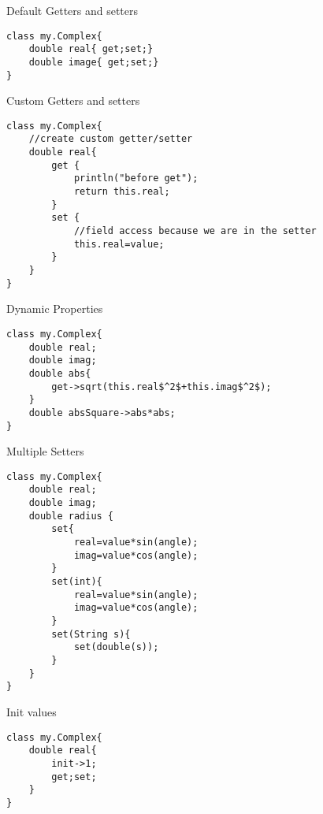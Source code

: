 \documentclass{tufte-book}
\begin{document}
            
            Default Getters and setters
\lstset{mathescape=true}
            \begin{lstlisting}
class my.Complex{
    double real{ get;set;}
    double image{ get;set;}
}
            \end{lstlisting}
\lstset{mathescape=false}

            
            Custom Getters and setters
\lstset{mathescape=true}
            \begin{lstlisting}
class my.Complex{
    //create custom getter/setter
    double real{
        get {
            println("before get");
            return this.real;
        }
        set {
            //field access because we are in the setter
            this.real=value;
        }
    }
}
            \end{lstlisting}
\lstset{mathescape=false}


            Dynamic Properties
\lstset{mathescape=true}
            \begin{lstlisting}
class my.Complex{
    double real;
    double imag;
    double abs{
        get->sqrt(this.real$^2$+this.imag$^2$);
    }
    double absSquare->abs*abs;
}
            \end{lstlisting}
\lstset{mathescape=false}

            
            Multiple Setters

\lstset{mathescape=true}
            \begin{lstlisting}
class my.Complex{
    double real;
    double imag;
    double radius {
        set{
            real=value*sin(angle);
            imag=value*cos(angle);
        }
        set(int){
            real=value*sin(angle);
            imag=value*cos(angle);
        }
        set(String s){
            set(double(s));
        }
    }
}
            \end{lstlisting}
\lstset{mathescape=false}

            Init values

\lstset{mathescape=true}
            \begin{lstlisting}
class my.Complex{
    double real{
        init->1;
        get;set;
    }
}
            \end{lstlisting}
\lstset{mathescape=false}
\end{document}
